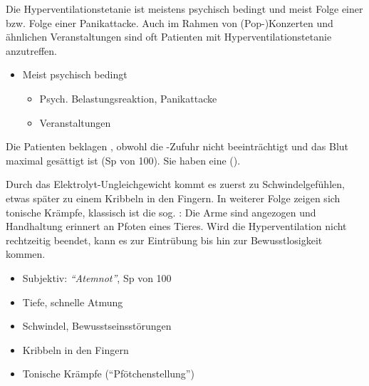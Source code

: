 
{%
Die Hyperventilationstetanie ist meistens psychisch bedingt
und meist Folge einer 
bzw. Folge einer Panikattacke. Auch im Rahmen von
(Pop-)Konzerten und ähnlichen Veranstaltungen sind oft
Patienten mit Hyperventilationstetanie anzutreffen.

\bigskip
}{
\begin{itemize}
  \item Meist psychisch bedingt
  \begin{itemize}
    \item Psych. Belastungsreaktion, Panikattacke
    \item Veranstaltungen
  \end{itemize}
\end{itemize}
}{}{}{}

{%
Die Patienten beklagen , obwohl die
-Zufuhr nicht beeinträchtigt und das Blut maximal
gesättigt ist (Sp von 100\PC*). Sie haben eine
 ().

Durch das Elektrolyt-Ungleichgewicht kommt es zuerst zu
Schwindelgefühlen, etwas später zu einem Kribbeln in den
Fingern. In weiterer Folge zeigen sich tonische Krämpfe,
klassisch ist die sog.
: Die Arme sind
angezogen und Handhaltung erinnert an Pfoten eines Tieres.
Wird die Hyperventilation nicht rechtzeitig beendet, kann es
zur Eintrübung bis hin zur Bewusstlosigkeit kommen.

\bigskip
}{
\begin{itemize}
  \item Subjektiv: \emph{\enquote{Atemnot}}, Sp von 100\PC* 
  \item Tiefe, schnelle Atmung
  \item Schwindel, Bewusstseinsstörungen
  \item Kribbeln in den Fingern
  \item Tonische Krämpfe (\enquote{Pfötchenstellung})
\end{itemize}
}{}{}{}



